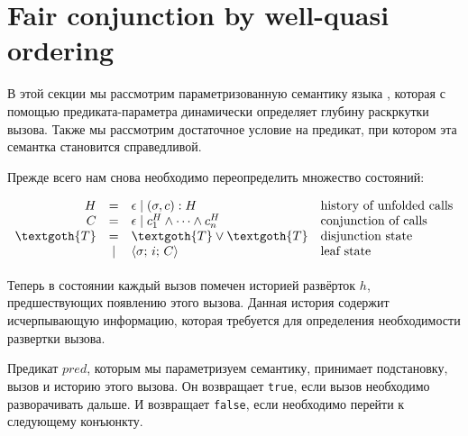 \section{Fair conjunction by well-quasi ordering}
\label{sec:fair-semantics}

В этой секции мы рассмотрим параметризованную семантику языка \mk, которая с помощью предиката-параметра динамически определяет глубину раскркутки вызова. Также мы рассмотрим достаточное условие на предикат, при котором эта семантка становится справедливой.

Прежде всего нам снова необходимо переопределить множество состояний:

\[
\begin{array}{rcll}
H & = & \epsilon \mid (\sigma, c) : H & \mbox{history of unfolded calls}\\
C & = & \epsilon \mid c_1^H \land \dots \land c_n^H & \mbox{conjunction of calls} \\
  \textgoth{T} & = & \textgoth{T} \lor \textgoth{T} & \mbox{disjunction state} \\
               & \mid & \inbr{\sigma;\, i;\, C} & \mbox{leaf state}\\[1mm]
\end{array}
\]

\noindent Теперь в состоянии каждый вызов помечен историей развёрток $h$, предшествующих появлению этого вызова. Данная история содержит исчерпывающую информацию, которая требуется для определения необходимости развертки вызова.  

Предикат $pred$, которым мы параметризуем семантику, принимает подстановку, вызов и историю этого вызова. Он возвращает \lstinline|true|, если вызов необходимо разворачивать дальше. И возвращает \lstinline|false|, если необходимо перейти к следующему конъюнкту.

